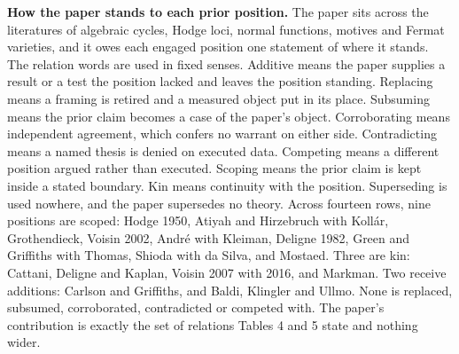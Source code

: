 \documentclass[10pt,twocolumn]{article}
\begin{document}
\textbf{How the paper stands to each prior position.} The paper sits
across the literatures of algebraic cycles, Hodge loci, normal
functions, motives and Fermat varieties, and it owes each engaged
position one statement of where it stands. The relation words are used
in fixed senses. Additive means the paper supplies a result or a test
the position lacked and leaves the position standing. Replacing means a
framing is retired and a measured object put in its place. Subsuming
means the prior claim becomes a case of the paper's object.
Corroborating means independent agreement, which confers no warrant on
either side. Contradicting means a named thesis is denied on executed
data. Competing means a different position argued rather than executed.
Scoping means the prior claim is kept inside a stated boundary. Kin
means continuity with the position. Superseding is used nowhere, and the
paper supersedes no theory. Across fourteen rows, nine positions are
scoped: Hodge 1950, Atiyah and Hirzebruch with Kollár, Grothendieck,
Voisin 2002, André with Kleiman, Deligne 1982, Green and Griffiths with
Thomas, Shioda with da Silva, and Mostaed. Three are kin: Cattani,
Deligne and Kaplan, Voisin 2007 with 2016, and Markman. Two receive
additions: Carlson and Griffiths, and Baldi, Klingler and Ullmo. None is
replaced, subsumed, corroborated, contradicted or competed with. The
paper's contribution is exactly the set of relations Tables 4 and 5
state and nothing wider.
\end{document}

